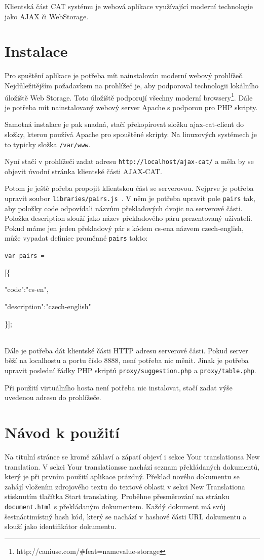 \documentclass[12pt,a4paper]{report}
\begin{document}
Klientská část CAT systému je webová aplikace využívající moderní technologie jako AJAX či WebStorage.

\section{Instalace}
Pro spuštění aplikace je potřeba mít nainstalován moderní webový prohlížeč. Nejdůležitějším požadavkem na prohlížeč je, aby podporoval technologii lokálního úložiště Web Storage. Toto úložiště podporují všechny moderní browsery\footnote{http://caniuse.com/\#feat=namevalue-storage}. Dále je potřeba mít nainstalovaný webový server Apache s podporou pro PHP skripty.

Samotná instalace je pak snadná, stačí překopírovat složku ajax-cat-client do složky, kterou používá Apache pro spouštěné skripty. Na linuxových systémech je to typicky složka {\tt /var/www}.

Nyní stačí v prohlížeči zadat adresu {\tt http://localhost/ajax-cat/} a měla by se objevit úvodní stránka klientské části AJAX-CAT.

Potom je ještě pořeba propojit klientskou část se serverovou. Nejprve je potřeba upravit soubor {\tt libraries/pairs.js }. V něm je potřeba upravit pole {\tt pairs} tak, aby položky code odpovídali názvům překladových dvojic na serverové části. Položka description slouží jako název překladového páru prezentovaný uživateli. Pokud máme jen jeden překladový pár s kódem \clqq cs-en\crqq  a názvem \clqq czech-english\crqq , může vypadat definice proměnné {\tt pairs} takto: \\

{\tt var pairs =

[\{

"code":"cs-en",

"description":"czech-english"

\}]; } \\

Dále je potřeba dát klientské části HTTP adresu serverové části. Pokud server běží na localhostu a portu číslo 8888, není potřeba nic měnit. Jinak je potřeba upravit poslední řádky PHP skriptů {\tt proxy/suggestion.php} a {\tt proxy/table.php}.

Při použití virtuálního hosta není potřeba nic instalovat, stačí zadat výše uvedenou adresu do prohlížeče.

\section{Návod k použití}
Na titulní stránce se kromě záhlaví a zápatí objeví i sekce \clqq Your translations\crqq  a \clqq New translation\crqq . V sekci \clqq Your translations\crqq  se nachází seznam překládaných dokumentů, který je při prvním použití aplikace prázdný. Překlad nového dokumentu se zahájí vložením zdrojového textu do textové oblasti v sekci \clqq New Translation\crqq  a stisknutím tlačítka \clqq Start translating\crqq . Proběhne přesměrování na stránku {\tt document.html} s překládaným dokumentem. Každý dokument má svůj šestnáctimístný hash kód, který se nachází v hashové části URL dokumentu a slouží jako identifikátor dokumentu.
\end{document}
